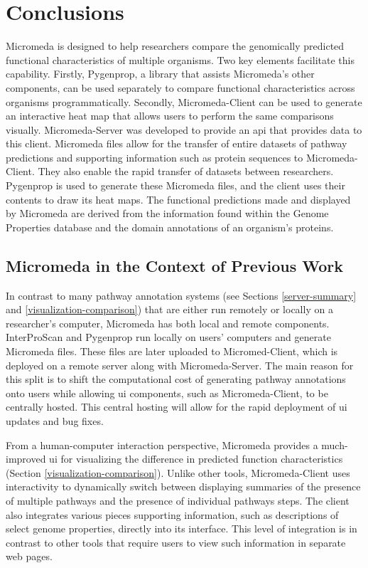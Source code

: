\chapter{Conclusions} \label{conclusion-chapter}

Micromeda is designed to help researchers compare the genomically predicted 
functional characteristics of multiple organisms. Two key elements facilitate 
this capability. Firstly, Pygenprop, a library that assists Micromeda's other 
components, can be used separately to compare functional characteristics across 
organisms programmatically. Secondly, Micromeda-Client can be used to generate 
an interactive heat map that allows users to perform the same comparisons 
visually. Micromeda-Server was developed to provide an \gls{api} that provides 
data to this client. Micromeda files allow for the transfer of entire datasets 
of pathway predictions and supporting information such as protein sequences to 
Micromeda-Client. They also enable the rapid transfer of datasets between 
researchers. Pygenprop is used to generate these Micromeda files, and the client 
uses their contents to draw its heat maps. The functional predictions made and 
displayed by Micromeda are derived from the information found within the Genome 
Properties database and the domain annotations of an organism's proteins. 

\section{Micromeda in the Context of Previous Work}

In contrast to many pathway annotation systems (see Sections 
\ref{server-summary} and \ref{visualization-comparison}) that are either run 
remotely or locally on a researcher's computer, Micromeda has both local and 
remote components. InterProScan and Pygenprop run locally on users' computers 
and generate Micromeda files. These files are later uploaded to Micromed-Client, 
which is deployed on a remote server along with Micromeda-Server. The main 
reason for this split is to shift the computational cost of generating pathway 
annotations onto users while allowing \gls{ui} components, such as 
Micromeda-Client, to be centrally hosted. This central hosting will allow for 
the rapid deployment of \gls{ui} updates and bug fixes.

From a human-computer interaction perspective, Micromeda provides a 
much-improved \gls{ui} for visualizing the difference in predicted function 
characteristics (Section \ref{visualization-comparison}). Unlike other tools, 
Micromeda-Client uses interactivity to dynamically switch between displaying 
summaries of the presence of multiple pathways and the presence of individual 
pathways steps. The client also integrates various pieces supporting information, such 
as descriptions of select genome properties, directly into its interface. This 
level of integration is in contrast to other tools that require users to view 
such information in separate web pages.

